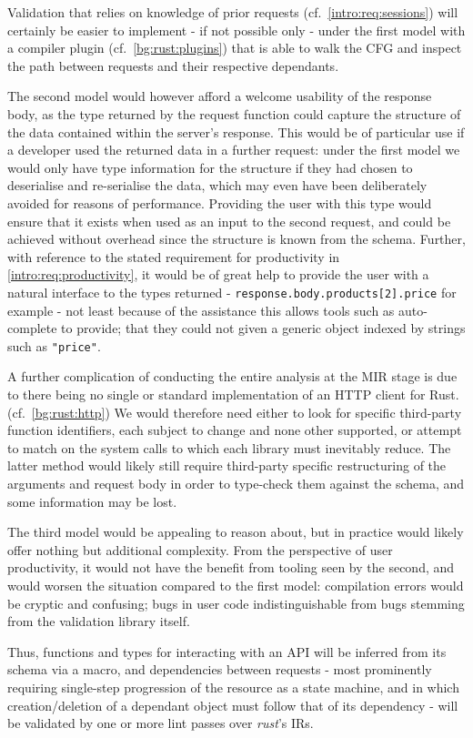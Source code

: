Validation that relies on knowledge of prior requests (cf.~\cref{intro:req:sessions}) will certainly be easier to implement - if not possible only - under the first model with a compiler plugin (cf.~\cref{bg:rust:plugins}) that is able to walk the CFG and inspect the path between requests and their respective dependants.

The second model would however afford a welcome usability of the response body, as the type returned by the request function could capture the structure of the data contained within the server's response. This would be of particular use if a developer used the returned data in a further request: under the first model we would only have type information for the structure if they had chosen to deserialise and re-serialise the data, which may even have been deliberately avoided  for reasons of performance. Providing the user with this type would ensure that it exists when used as an input to the second request, and could be achieved without overhead since the structure is known from the schema. Further, with reference to the stated requirement for productivity in \cref{intro:req:productivity}, it would be of great help to provide the user with a natural interface to the types returned - \texttt{response.body.products[2].price} for example - not least because of the assistance this allows tools such as auto-complete to provide; that they could not given a generic object indexed by strings such as \texttt{"price"}.

A further complication of conducting the entire analysis at the MIR stage is due to there being no single or standard implementation of an HTTP client for Rust. (cf.~\cref{bg:rust:http}) We would therefore need either to look for specific third-party function identifiers, each subject to change and none other supported, or attempt to match on the system calls to which each library must inevitably reduce. The latter method would likely still require third-party specific restructuring of the arguments and request body in order to type-check them against the schema, and some information may be lost.

The third model would be appealing to reason about, but in practice would likely offer nothing but additional complexity. From the perspective of user productivity, it would not have the benefit from tooling seen by the second, and would worsen the situation compared to the first model: compilation errors would be cryptic and confusing; bugs in user code indistinguishable from bugs stemming from the validation library itself.

Thus, functions and types for interacting with an API will be inferred from its schema via a macro, and dependencies between requests - most prominently  requiring single-step progression of the resource as a state machine, and  in which creation/deletion of a dependant object must follow that of its dependency - will be validated by one or more lint passes over \emph{rust}'s IRs.  \label{impl:proposal:validation}